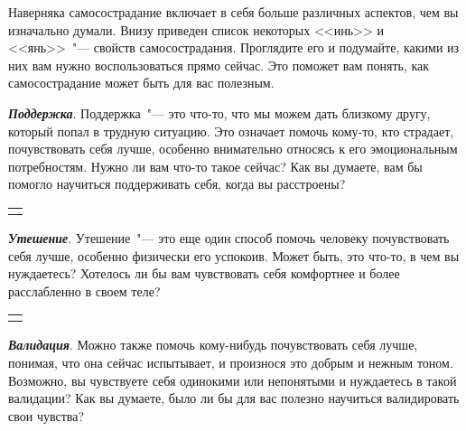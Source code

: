 \newpage
{}

Наверняка самосострадание включает в себя больше различных аспектов, чем вы изначально думали. Внизу приведен список некоторых <<инь>> и <<янь>>~"--- свойств самосострадания. Проглядите его и подумайте, какими из них вам нужно воспользоваться прямо сейчас. Это поможет вам понять, как самосострадание может быть для вас полезным.

\vspace{3ex}


\begin{itemize}
	\itemyinyang \textit{\textbf{Поддержка}}. Поддержка~"--- это что-то, что мы можем дать близкому другу, который попал в трудную ситуацию. Это означает помочь кому-то, кто страдает, почувствовать себя лучше, особенно внимательно относясь к его эмоциональным потребностям. Нужно ли вам что-то такое сейчас? Как вы думаете, вам бы помогло научиться поддерживать себя, когда вы расстроены?
\end{itemize}

\setlength{\extrarowheight}{2mm}
\begin{tabularx}{\textwidth}{X}
	\\
	\arrayrulecolor{gray}\hline\\
	\hline\\	
\end{tabularx}
\setlength{\extrarowheight}{0mm}
\begin{itemize}
	\itemyinyang \textit{\textbf{Утешение}}. Утешение~"--- это еще один способ помочь человеку почувствовать себя лучше, особенно физически его успокоив. Может быть, это что-то, в чем вы нуждаетесь? Хотелось ли бы вам чувствовать себя комфортнее и более расслабленно в своем теле? 
\end{itemize}

\setlength{\extrarowheight}{2mm}
\begin{tabularx}{\textwidth}{X}
	\\
	\arrayrulecolor{gray}\hline\\
	\hline\\
\end{tabularx}
\setlength{\extrarowheight}{0mm}
\begin{itemize}
	\itemyinyang \textit{\textbf{Валидация}}. Можно также помочь кому-нибудь почувствовать себя лучше, понимая, что она сейчас испытывает, и произнося это добрым и нежным тоном. Возможно, вы чувствуете себя одинокими или непонятыми и нуждаетесь в такой валидации? Как вы думаете, было ли бы для вас полезно научиться валидировать свои чувства?
\end{itemize}

